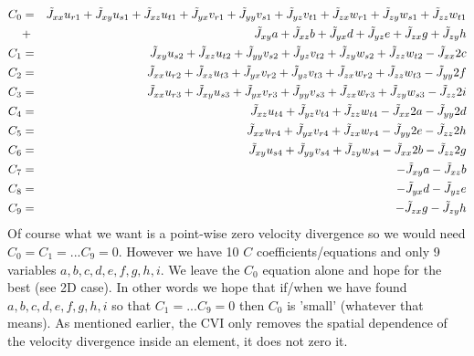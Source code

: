 \begin{eqnarray}
C_0 &=&
\tilde{J}_{xx} u_{r1} + \tilde{J}_{xy} u_{s1} + \tilde{J}_{xz} u_{t1} + 
\tilde{J}_{yx} v_{r1} + \tilde{J}_{yy} v_{s1} + \tilde{J}_{yz} v_{t1} + 
\tilde{J}_{zx} w_{r1} + \tilde{J}_{zy} w_{s1} + \tilde{J}_{zz} w_{t1} \nn\\
&+&\tilde{J}_{xy} a+\tilde{J}_{xz} b + \tilde{J}_{yx} d + \tilde{J}_{yz} e + \tilde{J}_{zx} g + \tilde{J}_{zy} h \nn\\
C_1 &=& 
\tilde{J}_{xy} u_{s2} + \tilde{J}_{xz} u_{t2} + 
\tilde{J}_{yy} v_{s2} + \tilde{J}_{yz} v_{t2} + 
\tilde{J}_{zy} w_{s2} + \tilde{J}_{zz} w_{t2} -\tilde{J}_{xx} 2c \nn \\ %
C_2 &=&
\tilde{J}_{xx} u_{r2} + \tilde{J}_{xz} u_{t3} +
\tilde{J}_{yx} v_{r2} + \tilde{J}_{yz} v_{t3} +
\tilde{J}_{zx} w_{r2} + \tilde{J}_{zz} w_{t3} -\tilde{J}_{yy} 2f \nn\\ %
C_3 &=&
\tilde{J}_{xx} u_{r3} + \tilde{J}_{xy} u_{s3} +
\tilde{J}_{yx} v_{r3} + \tilde{J}_{yy} v_{s3} +
\tilde{J}_{zx} w_{r3} + \tilde{J}_{zy} w_{s3} -\tilde{J}_{zz} 2i \nn\\ %
C_4 &=& \tilde{J}_{xz} u_{t4} + \tilde{J}_{yz} v_{t4} + \tilde{J}_{zz} w_{t4} -\tilde{J}_{xx} 2a - \tilde{J}_{yy} 2d  \nn\\ %
C_5 &=& \tilde{J}_{xx} u_{r4} + \tilde{J}_{yx} v_{r4} + \tilde{J}_{zx} w_{r4} -\tilde{J}_{yy} 2e - \tilde{J}_{zz} 2h  \nn\\ %
C_6 &=& \tilde{J}_{xy} u_{s4} + \tilde{J}_{yy} v_{s4} + \tilde{J}_{zy} w_{s4} -\tilde{J}_{xx} 2b - \tilde{J}_{zz} 2g  \nn\\ %
C_7 &=& - \tilde{J}_{xy} a - \tilde{J}_{xz} b  \nn\\ %
C_8 &=& - \tilde{J}_{yx} d - \tilde{J}_{yz} e  \nn\\ %
C_9 &=& - \tilde{J}_{zx} g - \tilde{J}_{zy} h  \nn   %
\end{eqnarray}
Of course what we want is a point-wise zero velocity divergence so we would 
need $C_0=C_1=...C_9=0$.
However we have 10 $C$ coefficients/equations  and only 9 variables $a,b,c,d,e,f,g,h,i$.
We leave the $C_0$ equation alone and hope for the best (see 2D case). In other words we hope that 
if/when we have found $a,b,c,d,e,f,g,h,i$ so that $C_1=...C_9=0$ then $C_0$ is 'small' 
(whatever that means). As mentioned earlier, the CVI only removes the 
spatial dependence of the velocity divergence inside an element, it does not zero it.


